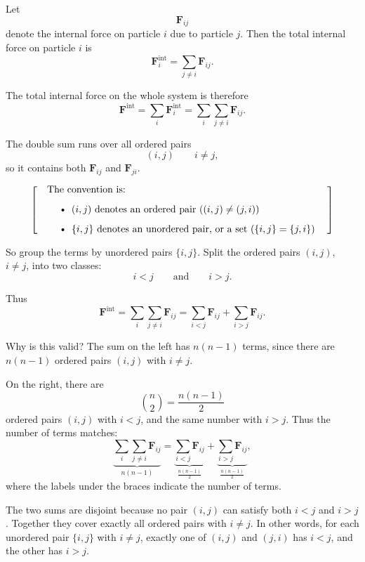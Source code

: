 \documentclass[a4paper,11pt]{article}
\begin{document}
Let
\[
\mathbf F_{ij}
\]
denote the internal force on particle $i$ due to particle $j$.
Then the total internal force on particle \(i\) is
\[
\mathbf F_i^{\mathrm{int}}=\sum_{j\ne i}\mathbf F_{ij}.
\]

The total internal force on the whole system is therefore
\[
\mathbf F^{\mathrm{int}}
=
\sum_i \mathbf F_i^{\mathrm{int}}
=
\sum_i\sum_{j\ne i}\mathbf F_{ij}.
\]

The double sum runs over all ordered pairs
\[
(i,j) \qquad i \ne j,
\]
so it contains both $\mathbf F_{ij}$ and $\mathbf F_{ji}$.


\[
\left[\quad
\begin{minipage}{0.8\textwidth}
The convention is:
\begin{itemize}
\item \((i,j)\) denotes an ordered pair ($(i,j) \ne (j,i)$)
\item \(\{i,j\}\) denotes an unordered pair, or a set ($\{i,j\} = \{j,i\}$)
\end{itemize}
\end{minipage}
\quad\right]
\]

So group the terms by unordered pairs $\{i,j\}$.  Split the ordered pairs $(i,j),$
\(i\ne j\), into two classes:
\[
i<j \qquad\text{and}\qquad i>j.
\]

Thus
\[
\mathbf F^{\mathrm{int}}
=
\sum_i\sum_{j\ne i}\mathbf F_{ij}
=
\sum_{i<j}\mathbf F_{ij}
+
\sum_{i>j}\mathbf F_{ij}.
\]

Why is this valid?  The sum on the left has $n(n-1)$ terms, since there are
$n(n-1)$ ordered pairs $(i,j)$ with $i \ne j$.

On the right, there are
\[
\binom n 2=\frac{n(n-1)}{2}
\]
ordered pairs $(i,j)$ with $i<j$, and the same number with $i>j$.
Thus the number of terms matches:
\[
\underbrace{\sum_i\sum_{j\ne i}\mathbf F_{ij}}_{n(n-1)}
=
\underbrace{\sum_{i<j}\mathbf F_{ij}}_{\frac{n(n-1)}2}
+
\underbrace{\sum_{i>j}\mathbf F_{ij}}_{\frac{n(n-1)}2},
\]
where the labels under the braces indicate the number of terms.

The two sums are disjoint because no pair $(i,j)$ can satisfy both $i<j$
and $i>j$. Together they cover exactly all ordered pairs with $i \ne j$.
In other words, for each unordered pair $\{i,j\}$ with $i \ne j$, exactly
one of $(i,j)$ and $(j,i)$ has $i<j$, and the other has $i>j$.
\end{document}

